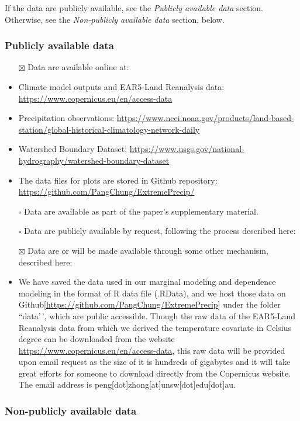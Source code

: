 \documentclass[
]{article}
\begin{document}
If the data are publicly available, see the \emph{Publicly available
data} section. Otherwise, see the \emph{Non-publicly available data}
section, below.

\subsubsection{Publicly available data}\label{publicly-available-data}

\begin{itemize}
\item[$\boxtimes$]
  Data are available online at:
\item
  Climate model outputs and EAR5-Land Reanalysis data:
  \url{https://www.copernicus.eu/en/access-data}
\item
  Precipitation observations:
  \url{https://www.ncei.noaa.gov/products/land-based-station/global-historical-climatology-network-daily}
\item
  Watershed Boundary Dataset:
  \url{https://www.usgs.gov/national-hydrography/watershed-boundary-dataset}
\item
  The data files for plots are stored in Github repository:
  \url{https://github.com/PangChung/ExtremePrecip/}
\item[$\square$]
  Data are available as part of the paper's supplementary material.
\item[$\square$]
  Data are publicly available by request, following the process
  described here:
\item[$\boxtimes$]
  Data are or will be made available through some other mechanism,
  described here:
\item
  We have saved the data used in our marginal modeling and dependence
  modeling in the format of R data file (.RData), and we host those data
  on Github{[}\url{https://github.com/PangChung/ExtremePrecip}{]} under
  the folder ``data'\,', which are public accessible. Though the raw
  data of the EAR5-Land Reanalysis data from which we derived the
  temperature covariate in Celsius degree can be downloaded from the
  website \url{https://www.copernicus.eu/en/access-data}, this raw data
  will be provided upon email request as the size of it is hundreds of
  gigabytes and it will take great efforts for someone to download
  directly from the Copernicus website. The email address is
  peng{[}dot{]}zhong{[}at{]}unsw{[}dot{]}edu{[}dot{]}au.
\end{itemize}

\subsubsection{Non-publicly available
data}\label{non-publicly-available-data}
\end{document}
